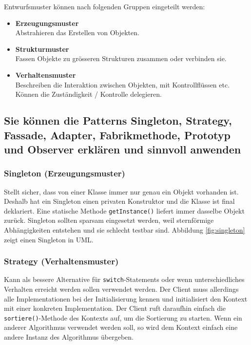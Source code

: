 Entwurfsmuster können nach folgenden Gruppen eingeteilt werden:
\begin{itemize}
  \item \textbf{Erzeugungsmuster} \\
  Abstrahieren das Erstellen von Objekten.
  \item \textbf{Strukturmuster} \\
  Fassen Objekte zu grösseren Strukturen zusammen oder verbinden sie.
  \item \textbf{Verhaltensmuster} \\
  Beschreiben die Interaktion zwischen Objekten, mit Kontrollflüssen etc. Können die Zuständigkeit / Kontrolle delegieren.
  
\end{itemize}

\newpage

\subsection{Sie können die Patterns Singleton, Strategy, Fassade, Adapter, Fabrikmethode, Prototyp und Observer erklären und sinnvoll anwenden}
\label{sec:patterns}

\subsubsection{Singleton (Erzeugungsmuster)}
Stellt sicher, dass von einer Klasse immer nur genau ein Objekt vorhanden ist. Deshalb hat ein Singleton einen privaten Konstruktor und die Klasse ist final deklariert. Eine statische Methode \texttt{getInstance()} liefert immer dasselbe Objekt zurück. Singleton sollten sparsam eingesetzt werden, weil sternförmige Abhängigkeiten entstehen und sie schlecht testbar sind. Abbildung \ref{fig:singleton} zeigt einen Singleton in UML.
    

\subsubsection{Strategy (Verhaltensmuster)}
\label{sec:strategypattern}
Kann als bessere Alternative für \texttt{switch}-Statements oder wenn unterschiedliches Verhalten erreicht werden sollen verwendet werden. Der Client muss allerdings alle Implementationen bei der Initialisierung kennen und initialisiert den Kontext mit einer konkreten Implementation. Der Client ruft daraufhin einfach die \texttt{sortiere()}-Methode des Kontexts auf, um die Sortierung zu starten. Wenn ein anderer Algorithmus verwendet werden soll, so wird dem Kontext einfach eine andere Instanz des Algorithmus übergeben.

